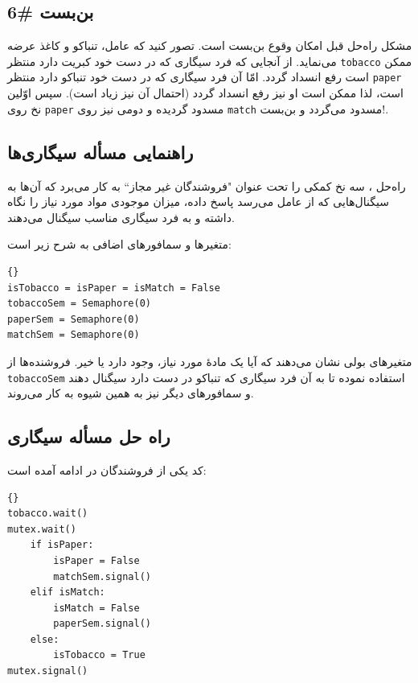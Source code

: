 \documentclass{book}
\newcommand{\clearemptydoublepage}{\newpage\cleardoublepage}
\begin{document}
\clearemptydoublepage
\subsection{بن‌بست \#6}

    مشکل راه‌حل قبل امکان وقوع بن‌بست است. تصور کنید که عامل، تنباکو و کاغذ عرضه می‌نماید. از آنجایی که فرد  سیگاری‌ که در دست خود کبریت دارد 
    منتظر {\tt tobacco} ممکن است رفع انسداد گردد. امّا آن فرد سیگاری که در دست خود تنباکو دارد منتظر {\tt paper} است، لذا ممکن است او نیز 
    رفع انسداد گردد (احتمال آن نیز زیاد است). سپس اوّلین نخ روی {\tt paper} مسدود گردیده و دومی نیز روی {\tt match} مسدود می‌گردد و بن‌بست!. 

\clearemptydoublepage
\subsection{راهنمایی مسأله سیگاری‌ها}

    راه‌حل ، 
    سه نخ کمکی را  تحت عنوان "فروشندگان غیر مجاز`` به کار می‌برد که آن‌ها به سیگنال‌هایی که از عامل‌
    می‌رسد پاسخ داده، میزان موجودی مواد مورد نیاز را نگاه داشته و به فرد سیگاری مناسب سیگنال می‌دهند. 

    متغیرها و سمافورهای اضافی به شرح زیر است: 

\begin{latin}
\begin{lstlisting}[title=\rl{راهنمایی مسأله سیگاری‌ها}]{}
isTobacco = isPaper = isMatch = False
tobaccoSem = Semaphore(0)
paperSem = Semaphore(0)
matchSem = Semaphore(0)
\end{lstlisting}
\end{latin}

    متغیرهای بولی نشان می‌دهند که آیا یک مادهٔ مورد نیاز، وجود دارد یا خیر. 
    فروشنده‌‌ها از {\tt tobaccoSem} استفاده نموده تا به آن فرد سیگاری که تنباکو در دست دارد سیگنال دهند و سمافورهای دیگر نیز به همین شیوه به کار می‌روند.


\clearemptydoublepage
\subsection{راه حل مسأله سیگاری}

    کد یکی از فروشندگان در ادامه آمده است:‌

\begin{latin}
\begin{lstlisting}[title=\rl{فروشنده \lr{A}}]{}
tobacco.wait()
mutex.wait()
    if isPaper:
        isPaper = False
        matchSem.signal()
    elif isMatch:
        isMatch = False
        paperSem.signal()
    else: 
        isTobacco = True
mutex.signal()
\end{lstlisting}
\end{latin}
\end{document}
